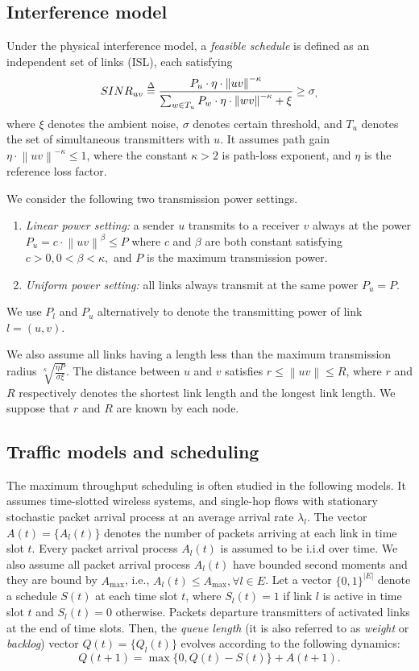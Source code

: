 \documentclass[journal]{IEEEtran}
\begin{document}
\subsection{Interference model}
 Under the physical interference model, a \emph{feasible schedule} is defined as an independent set of  links (ISL), each satisfying
{\small{\[
SINR_{uv} \buildrel \Delta \over = \frac{P_{u} \cdot \eta \cdot \left\|uv\right\|^{-\kappa} }{\sum\nolimits_{w \in T_u} {P_{w} \cdot
\eta \cdot \left\|wv\right\|^{-\kappa} +\xi } }\ge \sigma _{,}
\]}}
where $\xi $ denotes the ambient noise, $\sigma $  denotes certain threshold, and $T_u$ denotes the set of simultaneous transmitters with $u$.  It assumes path gain $\eta \cdot \left\|uv\right\|^{-\kappa} \le 1 $, where the constant $\kappa > 2 $ is path-loss exponent, and $\eta $ is the reference loss factor.

We consider the  following  two  transmission power settings.
\begin{enumerate}[\IEEEsetlabelwidth{12)}]
\item \emph{Linear power setting:} a sender $u$ transmits to a receiver $v$ always at
the power
$P_{u} =c\cdot \left\| uv \right\|^\beta \le P$  where $c$ and $\beta$ are both constant satisfying $c>0, 0 <\beta < \kappa,$ and $P$ is the maximum
transmission power.
\item \emph{Uniform power setting:} all links always transmit at the same power $P_{u}=P$.
\end{enumerate}
We use $P_l$ and $P_u$ alternatively to denote the transmitting power of link $l=(u,v)$.

We also assume all links  having a length less than the maximum transmission radius ${\sqrt[{\kappa}]{\frac{\eta P}{\sigma \xi}}}$. The distance between $u$ and $v$ satisfies $ r \le \left\| uv \right\|\le R$, where $r$ and $R$ respectively denotes the shortest link length and the longest link length. We suppose that $r$ and $R$  are known by each node.

\vspace*{-1\baselineskip}
\subsection{Traffic models and scheduling}
The maximum throughput scheduling is often studied in the following models. It assumes time-slotted wireless systems, and single-hop flows with stationary stochastic packet arrival process at an average arrival rate $\lambda _l$.
 The vector $ A(t)=\{A_l(t)\}$ denotes the number of packets arriving at each link in time slot $t$.
Every packet arrival process $A_l(t)$ is assumed to be i.i.d over time. We also assume all packet arrival process $A_l(t)$ have bounded second moments and they are bound by $A_{\max}$, i.e., $A_l(t) \leq A_{\max}, \forall l \in E$.
Let a vector $\{0,1\}^{|E|}$  denote a schedule $ S(t)$ at each time slot $t$, where $S_l(t)=1$ if link $l$ is active in time slot $t$ and $S_l(t)=0$ otherwise. Packets departure transmitters of activated links at the end of time slots.
Then, the \emph{queue length} (it is also referred to as \emph{weight} or \emph{backlog}) vector $ Q(t)=\{Q_l(t)\}$ evolves according to the following dynamics:
\[
     Q(t+1) = \max\{ 0,  Q(t)- S(t)\}+  A(t+1).
\]
\end{document}
